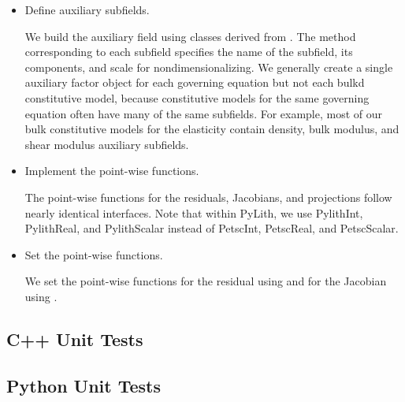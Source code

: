 \begin{itemize}
\item Define auxiliary subfields.

  We build the auxiliary field using classes derived from
  . The method
  corresponding to each subfield specifies the name of the subfield,
  its components, and scale for nondimensionalizing. We generally
  create a single auxiliary factor object for each governing equation
  but not each bulkd constitutive model, because constitutive models
  for the same governing equation often have many of the same
  subfields. For example, most of our bulk constitutive models for the
  elasticity contain density, bulk modulus, and shear modulus
  auxiliary subfields.


\item Implement the point-wise functions.

  The point-wise functions for the residuals, Jacobians, and
  projections follow nearly identical interfaces. Note that within
  PyLith, we use PylithInt, PylithReal, and PylithScalar instead of
  PetscInt, PetscReal, and PetscScalar.

\item Set the point-wise functions.

  We set the point-wise functions for the residual using
   and for the Jacobian using
  .
  
\end{itemize}


\subsection{C++ Unit Tests}




\subsection{Python Unit Tests}



